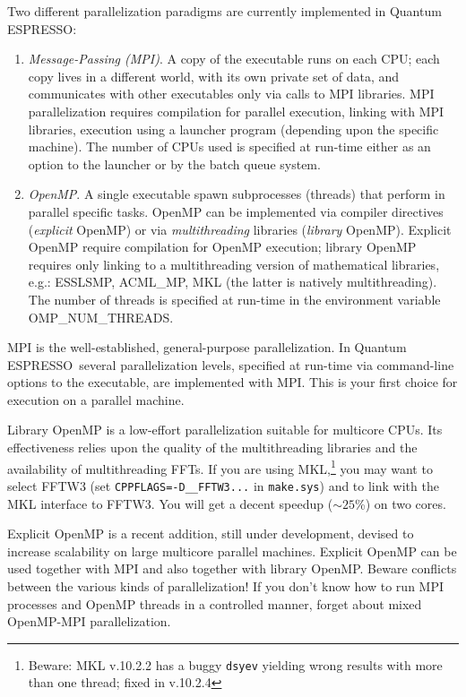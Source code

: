 \documentclass[12pt,a4paper]{article}
\def\qe{{\sc Quantum ESPRESSO}}
\begin{document}
Two different parallelization paradigms are currently implemented 
in \qe:
\begin{enumerate}
\item {\em Message-Passing (MPI)}. A copy of the executable runs 
on each CPU; each copy lives in a different world, with its own
private set of data, and communicates with other executables only
via calls to MPI libraries. MPI parallelization requires compilation 
for parallel execution, linking with MPI libraries, execution using 
a launcher program (depending upon the specific machine). The number of CPUs used
is specified at run-time either as an option to the launcher or
by the batch queue system. 
\item {\em OpenMP}.  A single executable spawn subprocesses
(threads) that perform in parallel specific tasks. 
OpenMP can be implemented via compiler directives ({\em explicit} 
OpenMP) or via {\em multithreading} libraries  ({\em library} OpenMP).
Explicit OpenMP require compilation for OpenMP execution;
library OpenMP requires only linking to a multithreading
version of mathematical libraries, e.g.:
ESSLSMP, ACML\_MP, MKL (the latter is natively multithreading).
The number of threads is specified at run-time in the environment 
variable OMP\_NUM\_THREADS. 
\end{enumerate}

MPI is the well-established, general-purpose parallelization.
In \qe\ several parallelization levels, specified at run-time
via command-line options to the executable, are implemented
with MPI. This is your first choice for execution on a parallel 
machine.

Library OpenMP is a low-effort parallelization suitable for
multicore CPUs. Its effectiveness relies upon the quality of 
the multithreading libraries and the availability of 
multithreading FFTs. If you are using MKL,\footnote{Beware: 
MKL v.10.2.2 has a buggy \texttt{dsyev} yielding wrong results 
with more than one thread; fixed in v.10.2.4}
you may want to select FFTW3 (set \texttt{CPPFLAGS=-D\_\_FFTW3...}
in \texttt{make.sys}) and to link with the MKL interface to FFTW3. 
You will get a decent speedup ($\sim 25$\%) on two cores.

Explicit OpenMP is a recent addition, still under
development, devised to increase scalability on
large multicore parallel machines. Explicit OpenMP can be used
together with MPI and also together with library OpenMP. Beware
conflicts between the various kinds of parallelization! 
If you don't know how to run MPI processes
and OpenMP threads in a controlled manner, forget about mixed 
OpenMP-MPI parallelization.
\end{document}
